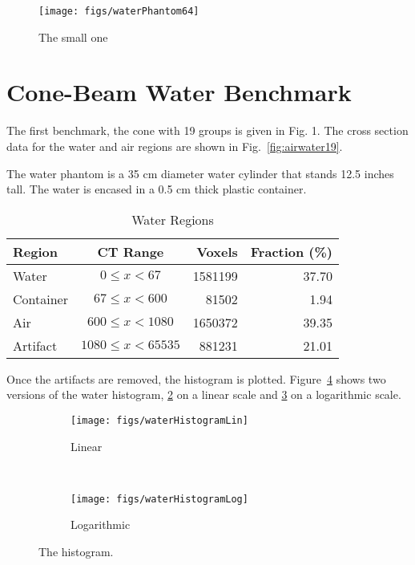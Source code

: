 \begin{figure}[tb]
  \begin{center}
   \texttt{[image: figs/waterPhantom64]}
  \end{center}
  \caption{The small one}
\label{fig:waterPhantom64}
\end{figure}

\section{Cone-Beam Water Benchmark}

The first benchmark, the cone with 19 groups is given in Fig. 1. The cross section data for the water and air regions are shown in Fig.~\ref{fig:airwater19}.

The water phantom is a 35 cm diameter water cylinder that stands 12.5 inches tall. The water is encased in a 0.5 cm thick plastic container.

\begin{table}[ht]
\caption{Water Regions}
\centering 
\begin{tabular}{l c r r}
\hline \hline   
Region    & CT Range & Voxels & Fraction (\%)\\ [0.5ex] 
\hline
Water     & $0 \leq x < 67$ & 1581199 & 37.70 \\
Container & $67 \leq x < 600$ & 81502 & 1.94 \\
Air       & $600 \leq x < 1080$ & 1650372  & 39.35 \\
Artifact  & $1080 \leq x < 65535$ & 881231 & 21.01 \\  [1ex]
\hline
\end{tabular}
\label{table:nonlin}
\end{table}

Once the artifacts are removed, the histogram is plotted. Figure~\ref{fig:waterHist} shows two versions of the water histogram, \ref{fig:waterHistLin} on a linear scale and \ref{fig:waterHistLog} on a logarithmic scale.

\begin{figure}
    \centering
    \begin{subfigure}[b]{0.45\textwidth}
        \texttt{[image: figs/waterHistogramLin]}
        \caption{Linear}
        \label{fig:waterHistLin}
    \end{subfigure}
    ~
    \begin{subfigure}[b]{0.45\textwidth}
        \texttt{[image: figs/waterHistogramLog]}
        \caption{Logarithmic}
        \label{fig:waterHistLog}
    \end{subfigure}
    \caption{The histogram.}\label{fig:waterHist}
\end{figure}

